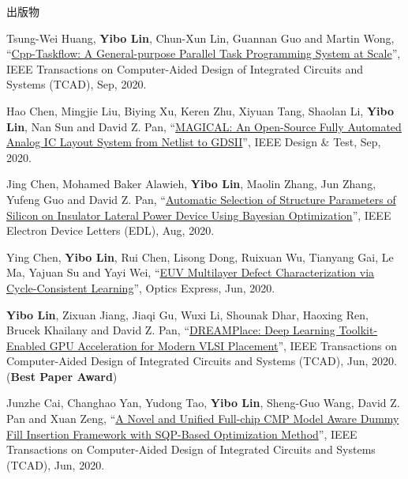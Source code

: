 \begin{rSection}{出版物}
\begin{description}[font=\normalfont, rightmargin=2em]
{}
            

\item[{[J25]}]{
        Tsung-Wei Huang, \textbf{Yibo Lin}, Chun-Xun Lin, Guannan Guo and Martin Wong, 
    ``\href{https://doi.org/10.1109/TCAD.2021.3082507}{Cpp-Taskflow: A General-purpose Parallel Task Programming System at Scale}'', 
    IEEE Transactions on Computer-Aided Design of Integrated Circuits and Systems (TCAD), Sep, 2020.
    
}
            

\item[{[J24]}]{
        Hao Chen, Mingjie Liu, Biying Xu, Keren Zhu, Xiyuan Tang, Shaolan Li, \textbf{Yibo Lin}, Nan Sun and David Z. Pan, 
    ``\href{https://doi.org/10.1109/MDAT.2020.3024153}{MAGICAL: An Open-Source Fully Automated Analog IC Layout System from Netlist to GDSII}'', 
    IEEE Design \& Test, Sep, 2020.
    
}
            

\item[{[J23]}]{
        Jing Chen, Mohamed Baker Alawieh, \textbf{Yibo Lin}, Maolin Zhang, Jun Zhang, Yufeng Guo and David Z. Pan, 
    ``\href{https://doi.org/10.1109/LED.2020.3013571}{Automatic Selection of Structure Parameters of Silicon on Insulator Lateral Power Device Using Bayesian Optimization}'', 
    IEEE Electron Device Letters (EDL), Aug, 2020.
    
}
            

\item[{[J22]}]{
        Ying Chen, \textbf{Yibo Lin}, Rui Chen, Lisong Dong, Ruixuan Wu, Tianyang Gai, Le Ma, Yajuan Su and Yayi Wei, 
    ``\href{https://doi.org/10.1364/OE.394590}{EUV Multilayer Defect Characterization via Cycle-Consistent Learning}'', 
    Optics Express, Jun, 2020.
    
}
            

\item[{[J21]}]{
        \textbf{Yibo Lin}, Zixuan Jiang, Jiaqi Gu, Wuxi Li, Shounak Dhar, Haoxing Ren, Brucek Khailany and David Z. Pan, 
    ``\href{https://doi.org/10.1109/TCAD.2020.3003843}{DREAMPlace: Deep Learning Toolkit-Enabled GPU Acceleration for Modern VLSI Placement}'', 
    IEEE Transactions on Computer-Aided Design of Integrated Circuits and Systems (TCAD), Jun, 2020.
    (\textbf{Best Paper Award})
}
            

\item[{[J20]}]{
        Junzhe Cai, Changhao Yan, Yudong Tao, \textbf{Yibo Lin}, Sheng-Guo Wang, David Z. Pan and Xuan Zeng, 
    ``\href{https://doi.org/10.1109/TCAD.2020.3001380}{A Novel and Unified Full-chip CMP Model Aware Dummy Fill Insertion Framework with SQP-Based Optimization Method}'', 
    IEEE Transactions on Computer-Aided Design of Integrated Circuits and Systems (TCAD), Jun, 2020.
    
}
\end{description}
\end{rSection}
